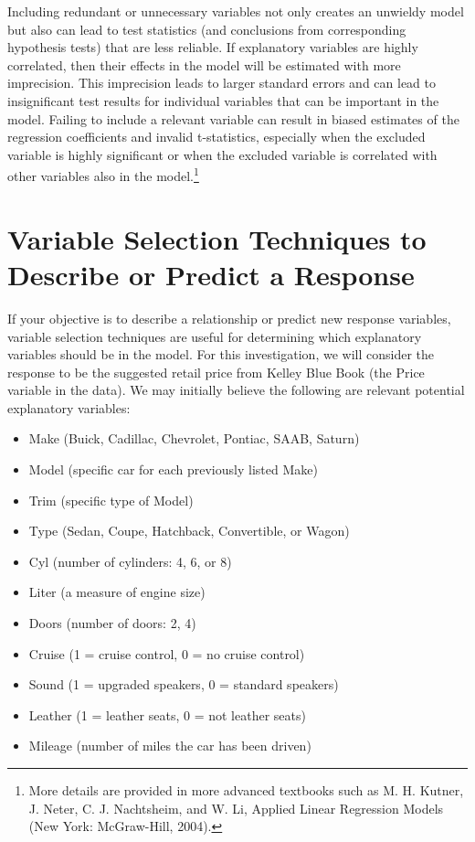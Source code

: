 \documentclass[
]{report}
\providecommand{\tightlist}{%
  \setlength{\itemsep}{0pt}\setlength{\parskip}{0pt}}
\begin{document}
Including redundant or unnecessary variables not only creates an unwieldy model but also can lead to test statistics (and conclusions from corresponding hypothesis tests) that are less reliable. If explanatory variables are highly correlated, then their effects in the model will be estimated with more imprecision. This imprecision leads to larger standard errors and can lead to insignificant test results for individual variables that can be important in the model. Failing to include a relevant variable can result in biased estimates of the regression coefficients and invalid t-statistics, especially when the excluded variable is highly significant or when the excluded variable is correlated with other variables also in the model.\footnote{More details are provided in more advanced textbooks such as M. H. Kutner, J. Neter, C. J. Nachtsheim, and W. Li, Applied Linear Regression Models (New York: McGraw-Hill, 2004).}

\section{Variable Selection Techniques to Describe or Predict a Response}\label{variable-selection-techniques-to-describe-or-predict-a-response}

If your objective is to describe a relationship or predict new response variables, variable selection techniques are useful for determining which explanatory variables should be in the model. For this investigation, we will consider the response to be the suggested retail price from Kelley Blue Book (the Price variable in the data). We may initially believe the following are relevant potential explanatory variables:

\begin{itemize}
\tightlist
\item
  Make (Buick, Cadillac, Chevrolet, Pontiac, SAAB, Saturn)
\item
  Model (specific car for each previously listed Make)
\item
  Trim (specific type of Model)
\item
  Type (Sedan, Coupe, Hatchback, Convertible, or Wagon)
\item
  Cyl (number of cylinders: 4, 6, or 8)
\item
  Liter (a measure of engine size)
\item
  Doors (number of doors: 2, 4)
\item
  Cruise (1 = cruise control, 0 = no cruise control)
\item
  Sound (1 = upgraded speakers, 0 = standard speakers)
\item
  Leather (1 = leather seats, 0 = not leather seats)
\item
  Mileage (number of miles the car has been driven)
\end{itemize}
\end{document}
